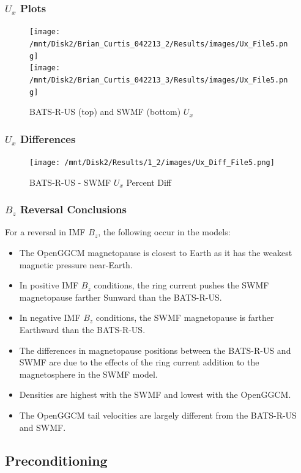 \begin{frame}
\frametitle{$U_x$ Plots}
\begin{center}
\begin{figure}
\texttt{[image: /mnt/Disk2/Brian\_Curtis\_042213\_2/Results/images/Ux\_File5.png]}\\
\texttt{[image: /mnt/Disk2/Brian\_Curtis\_042213\_3/Results/images/Ux\_File5.png]}\\
\caption{BATS-R-US (top) and SWMF (bottom) $U_x$}
\end{figure}

\end{center}
\end{frame}


\begin{frame}
\frametitle{$U_x$ Differences}
\begin{center}
\begin{figure}
\texttt{[image: /mnt/Disk2/Results/1\_2/images/Ux\_Diff\_File5.png]}\\
\caption{BATS-R-US - SWMF $U_x$ Percent Diff}
\end{figure}
\end{center}
\end{frame}

\begin{frame}[shrink]
\frametitle{$B_z$ Reversal Conclusions}
For a reversal in IMF $B_z$, the following occur in the models:
\begin{itemize}
  \item The OpenGGCM magnetopause is closest to Earth as it has the weakest
  magnetic pressure near-Earth.
  \item In positive IMF $B_z$ conditions, the ring current pushes the SWMF
  magnetopause farther Sunward than the BATS-R-US.
  \item In negative IMF $B_z$ conditions, the SWMF magnetopause is farther
  Earthward than the BATS-R-US.
  \item The differences in magnetopause positions between the BATS-R-US and SWMF
  are due to the effects of the ring current addition to the magnetosphere in
  the SWMF model.
  \item Densities are highest with the SWMF and lowest with the OpenGGCM.
  \item The OpenGGCM tail velocities are largely different from the BATS-R-US
  and SWMF.
\end{itemize}
\end{frame}

\subsection{Preconditioning}

